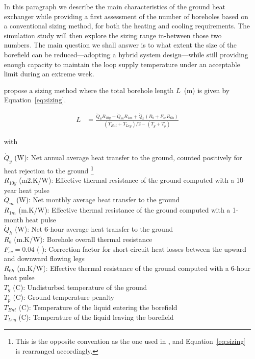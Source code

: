 In this paragraph we describe the main characteristics of the ground heat exchanger while providing a first assessment of the number of boreholes based on a conventional sizing method, for both the heating and cooling requirements.
The simulation study will then explore the sizing range in-between those two numbers.
The main question we shall answer is to what extent the size of the borefield can be reduced---adopting a hybrid system design---while still providing enough capacity to maintain the loop supply temperature under an acceptable limit during an extreme week.

\cite{Kavanaugh2014} propose a sizing method where the total borehole length $L$~(m) is given by Equation~\ref{eq:sizing}.

\begin{align}
    \label{eq:sizing}
    L &= \frac{\dot{Q}_a R_{10y} + \dot{Q}_m R_{1m} + \dot{Q}_h \left( R_b + F_{sc} R_{6h} \right)}{\left( T_{Ent} + T_{Lvg} \right) / 2 - \left( T_g + T_p \right)}
\end{align}

with

\begin{avec}
    $\dot{Q}_y$ (W): Net annual average heat transfer to the ground, counted positively for heat rejection to the ground%
    \footnote{This is the opposite convention as the one used in \cite{Kavanaugh2014}, and Equation~\ref{eq:sizing} is rearranged accordingly.}\\
    $R_{10y}$ (m2.K/W): Effective thermal resistance of the ground computed with a 10-year heat pulse \\
    $\dot{Q}_m$ (W): Net monthly average heat transfer to the ground\\
    $R_{1m}$ (m.K/W): Effective thermal resistance of the ground computed with a 1-month heat pulse \\
    $\dot{Q}_h$ (W): Net 6-hour average heat transfer to the ground\\
    $R_b$ (m.K/W): Borehole overall thermal resistance \\
    $F_{sc} = 0.04$ (-): Correction factor for short-circuit heat losses between the upward and downward flowing legs\\
    $R_{6h}$ (m.K/W): Effective thermal resistance of the ground computed with a 6-hour heat pulse \\
    $T_g$ (C): Undisturbed temperature of the ground \\
    $T_p$ (C): Ground temperature penalty \\
    $T_{Ent}$ (C): Temperature of the liquid entering the borefield \\
    $T_{Lvg}$ (C): Temperature of the liquid leaving the borefield \\
\end{avec}

